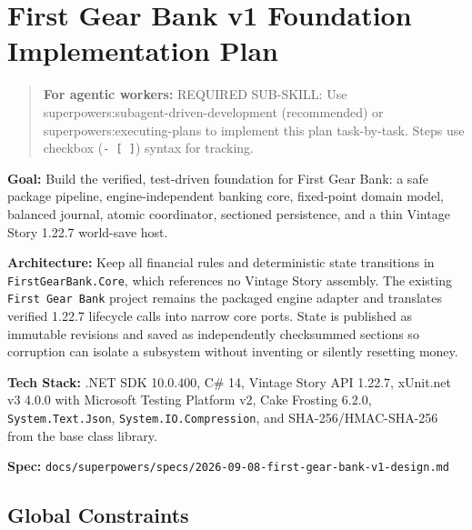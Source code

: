 \documentclass[
  10pt,
  letterpaper,
]{article}
\author{}
\date{}
\newcommand{\passthrough}[1]{#1}
\begin{document}
\section{First Gear Bank v1 Foundation Implementation
Plan}\label{first-gear-bank-v1-foundation-implementation-plan}

\begin{quote}
\textbf{For agentic workers:} REQUIRED SUB-SKILL: Use
superpowers:subagent-driven-development (recommended) or
superpowers:executing-plans to implement this plan task-by-task. Steps
use checkbox (\passthrough{\lstinline!- [ ]!}) syntax for tracking.
\end{quote}

\textbf{Goal:} Build the verified, test-driven foundation for First Gear
Bank: a safe package pipeline, engine-independent banking core,
fixed-point domain model, balanced journal, atomic coordinator,
sectioned persistence, and a thin Vintage Story 1.22.7 world-save host.

\textbf{Architecture:} Keep all financial rules and deterministic state
transitions in \passthrough{\lstinline!FirstGearBank.Core!}, which
references no Vintage Story assembly. The existing
\passthrough{\lstinline!First Gear Bank!} project remains the packaged
engine adapter and translates verified 1.22.7 lifecycle calls into
narrow core ports. State is published as immutable revisions and saved
as independently checksummed sections so corruption can isolate a
subsystem without inventing or silently resetting money.

\textbf{Tech Stack:} .NET SDK 10.0.400, C\# 14, Vintage Story API
1.22.7, xUnit.net v3 4.0.0 with Microsoft Testing Platform v2, Cake
Frosting 6.2.0, \passthrough{\lstinline!System.Text.Json!},
\passthrough{\lstinline!System.IO.Compression!}, and
SHA-256/HMAC-SHA-256 from the base class library.

\textbf{Spec:}
\texttt{docs/}\allowbreak{}\texttt{superpowers/}\allowbreak{}\texttt{specs/}\allowbreak{}\texttt{2026-}\allowbreak{}\texttt{09-}\allowbreak{}\texttt{08-}\allowbreak{}\texttt{first-}\allowbreak{}\texttt{gear-}\allowbreak{}\texttt{bank-}\allowbreak{}\texttt{v1-}\allowbreak{}\texttt{design.}\allowbreak{}\texttt{md}

\subsection{Global Constraints}\label{global-constraints}
\end{document}
